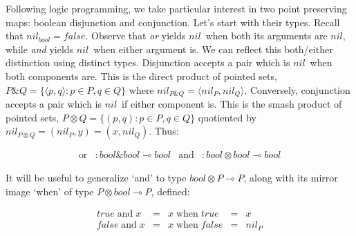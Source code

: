 \documentclass[runningheads]{llncs}
\newcommand\strong[1]{{\bfseries#1}}
\newcommand\todo[1]{{\color{IndianRed}#1}}
\newcommand\xxx{\text{\todo{\strong{XXX}}}}
\renewcommand\todo[1]{\ignorespaces}\renewcommand\xxx{\text{\color{IndianRed}\strong{XXX}}}
\newcommand\name[1]{\ensuremath{\mathit{#1}}}
\newcommand\<\:                 %
\newcommand\lto\multimap        %
\newcommand\with{\mathbin{\&}}
\newcommand\ox\otimes
\newcommand\typename\textit
\newcommand\bool{\typename{bool}}
\newcommand\kword[1]{\ensuremath{\textrm{#1}}}
\newcommand\nil{\name{nil}}
\newcommand\true{\name{true}}
\newcommand\false{\name{false}}
\newcommand\tand{\mathrel{\kword{and}}}
\newcommand\tor{\mathrel{\kword{or}}}
\newcommand\whenkword{\kword{when}}
\newcommand\when{\mathrel{\whenkword}}
\newcommand\withpair[1]{\ensuremath{\langle{#1}\rangle}}
\begin{document}
Following logic programming, we take particular interest in two point preserving maps: boolean disjunction and conjunction.
Let's start with their types.
Recall that $\nil_\bool = \false$.
Observe that \emph{or} yields \nil\ when both its arguments are \nil, while \emph{and} yields \nil\ when either argument is.
We can reflect this both/either distinction using distinct types.
%
\noindent
Disjunction accepts
a pair which is \nil\ when both components are.
This is the {direct product} of pointed sets, $P \with Q = \{\withpair{p,q} : p \in P, q \in Q\}$ where $\nil_{P \with Q} = \withpair{\nil_P, \nil_Q}$.
%
Conversely, conjunction accepts
a pair which is \nil\ if either component is.
This is the {smash product} of pointed sets, $P \otimes Q = \{(p,q) : p \in P, q \in Q\}$ quotiented by \(\nil_{P \otimes Q} = (\nil_P, y) = (x, \nil_Q)\).
Thus:

\begin{align*}
  \kword{or} &: \bool \with \bool \lto \bool
  &
  \kword{and} &: \bool \ox \bool \lto \bool
\end{align*}

\noindent
It will be useful to generalize `and' to type $\bool \otimes P \lto P$, along with its mirror image `\whenkword' of type $P \otimes \bool \lto P$, defined:\footnotemark{}
\nopagebreak[2]

\[%
\begin{array}{rclcl}
  \true \tand x
  &=& x \when \true
  &=& x
  \\
  \false \tand x
  &=& x \when \false
  &=& \nil_P
\end{array}\]
\end{document}
